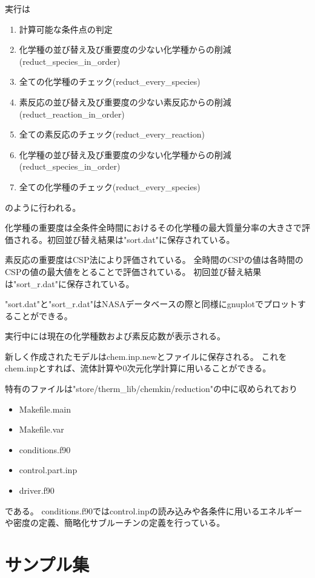 \documentclass{jsarticle}
\begin{document}
実行は
\begin{enumerate}
\item 計算可能な条件点の判定
\item 化学種の並び替え及び重要度の少ない化学種からの削減(reduct\_species\_in\_order)
\item 全ての化学種のチェック(reduct\_every\_species)
\item 素反応の並び替え及び重要度の少ない素反応からの削減(reduct\_reaction\_in\_order)
\item 全ての素反応のチェック(reduct\_every\_reaction)
\item 化学種の並び替え及び重要度の少ない化学種からの削減(reduct\_species\_in\_order)
\item 全ての化学種のチェック(reduct\_every\_species)
\end{enumerate}
のように行われる。

化学種の重要度は全条件全時間におけるその化学種の最大質量分率の大きさで評価される。初回並び替え結果は"sort.dat"に保存されている。

素反応の重要度はCSP法により評価されている。
全時間のCSPの値は各時間のCSPの値の最大値をとることで評価されている。
初回並び替え結果は"sort\_r.dat"に保存されている。

"sort.dat"と"sort\_r.dat"はNASAデータベースの際と同様にgnuplotでプロットすることができる。

実行中には現在の化学種数および素反応数が表示される。

新しく作成されたモデルはchem.inp.newとファイルに保存される。
これをchem.inpとすれば、流体計算や0次元化学計算に用いることができる。

\hspace{1em}

特有のファイルは"store/therm\_lib/chemkin/reduction"の中に収められており
\begin{itemize}
\item Makefile.main
\item Makefile.var
\item conditions.f90
\item control.part.inp
\item driver.f90
\end{itemize}
である。
conditions.f90ではcontrol.inpの読み込みや各条件に用いるエネルギーや密度の定義、簡略化サブルーチンの定義を行っている。
\newpage

\part{サンプル集}%
\newpage
\end{document}
